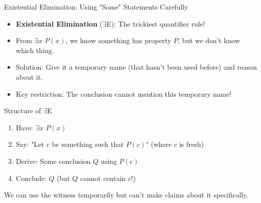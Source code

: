 \documentclass{beamer}
\begin{document}
	\begin{frame}{Existential Elimination: Using "Some" Statements Carefully}
		\begin{itemize}
			\item \textbf{Existential Elimination} ($\exists$E): The trickiest quantifier rule!
			\item From $\exists x$ $P(x)$, we know something has property $P$, but we don't know which thing.
			\item Solution: Give it a temporary name (that hasn't been used before) and reason about it.
			\item Key restriction: The conclusion cannot mention this temporary name!
		\end{itemize}
		
		\begin{alertblock}{Structure of $\exists$E}
			\begin{enumerate}
				\item Have: $\exists x$ $P(x)$
				\item Say: "Let $c$ be something such that $P(c)$" (where $c$ is fresh)
				\item Derive: Some conclusion $Q$ using $P(c)$
				\item Conclude: $Q$ (but $Q$ cannot contain $c$!)
			\end{enumerate}
			We can use the witness temporarily but can't make claims about it specifically.
		\end{alertblock}
	\end{frame}
	
\end{document}
